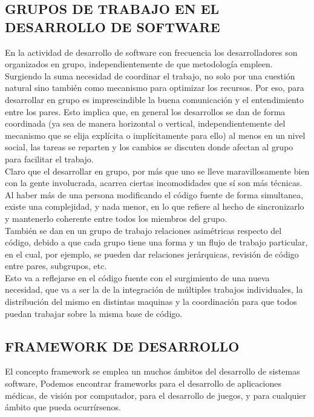 \subsection{GRUPOS DE TRABAJO EN EL DESARROLLO DE SOFTWARE}

En la actividad de desarrollo de software con frecuencia los desarrolladores son organizados en grupo, independientemente de que metodología empleen. Surgiendo la suma necesidad de coordinar el trabajo, no solo por una cuestión natural sino también como mecanismo para optimizar los recursos.
Por eso, para desarrollar en grupo es imprescindible la buena comunicación y el entendimiento entre los pares. Esto implica que, en general los desarrollos se dan de forma coordinada (ya sea de manera horizontal o vertical, independientemente del mecanismo que se elija explícita o implícitamente para ello) al menos en un nivel social, las tareas se reparten y los cambios se discuten donde afectan al grupo para facilitar el trabajo.\\

Claro que el desarrollar en grupo, por más que uno se lleve maravillosamente bien con la gente involucrada, acarrea ciertas incomodidades que sí son más técnicas. Al haber más de una persona modificando el código fuente de forma simultanea, existe una complejidad, y nada menor, en lo que refiere al hecho de sincronizarlo y mantenerlo coherente entre todos los miembros del grupo.\\

También se dan en un grupo de trabajo relaciones asimétricas respecto del código, debido a que cada grupo tiene una forma y un flujo de trabajo particular, en el cual, por ejemplo, se pueden dar relaciones jerárquicas, revisión de código entre pares, subgrupos, etc.\\

Esto va a reflejarse en el código fuente con el surgimiento de una nueva necesidad, que va a ser la de la integración de múltiples trabajos individuales, la distribución del mismo en distintas maquinas y la coordinación para que todos puedan trabajar sobre la misma base de código.

\subsection{FRAMEWORK DE DESARROLLO}

El concepto framework se emplea un muchos ámbitos del desarrollo de sistemas
software, Podemos encontrar frameworks para el desarrollo de aplicaciones médicas, de visión por computador, para el desarrollo de juegos, y para cualquier ámbito que pueda ocurrírsenos.\\

